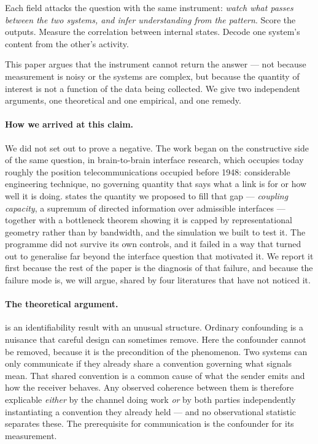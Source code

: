 \documentclass[11pt,a4paper]{article}
\theoremstyle{plain}
\theoremstyle{definition}
\theoremstyle{remark}
\begin{document}
Each field attacks the question with the same instrument: \emph{watch what passes between
the two systems, and infer understanding from the pattern}. Score the outputs. Measure the
correlation between internal states. Decode one system's content from the other's activity.

This paper argues that the instrument cannot return the answer --- not because measurement
is noisy or the systems are complex, but because the quantity of interest is not a function
of the data being collected. We give two independent arguments, one theoretical and one
empirical, and one remedy.

\paragraph{How we arrived at this claim.}
We did not set out to prove a negative. The work began on the constructive side of the same
question, in brain-to-brain interface research, which occupies today roughly the position
telecommunications occupied before 1948: considerable engineering technique, no governing
quantity that says what a link is for or how well it is doing.  states the
quantity we proposed to fill that gap --- \emph{coupling capacity}, a supremum of directed
information over admissible interfaces --- together with a bottleneck theorem showing it is
capped by representational geometry rather than by bandwidth, and the simulation we built to
test it. The programme did not survive its own controls, and it failed in a way that turned
out to generalise far beyond the interface question that motivated it. We report it first
because the rest of the paper is the diagnosis of that failure, and because the failure mode
is, we will argue, shared by four literatures that have not noticed it.

\paragraph{The theoretical argument.}
 is an identifiability result with an unusual structure. Ordinary
confounding is a nuisance that careful design can sometimes remove. Here the confounder
cannot be removed, because it is the precondition of the phenomenon. Two systems can only
communicate if they already share a convention governing what signals mean. That shared
convention is a common cause of what the sender emits and how the receiver behaves. Any
observed coherence between them is therefore explicable \emph{either} by the channel doing
work \emph{or} by both parties independently instantiating a convention they already
held --- and no observational statistic separates these. The prerequisite for communication
is the confounder for its measurement.
\end{document}
